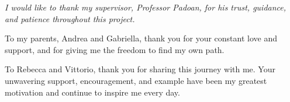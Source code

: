


\newcommand{\submissionblankpage}{%
  \null
  \thispagestyle{empty}%
  \clearpage
}

\newcommand{\submissionacknowledgementpage}{%
  \thispagestyle{empty}%
  \vspace*{\fill}
  \begin{center}
    \begin{minipage}{0.78\textwidth}
      \centering
      \itshape
      I would like to thank my supervisor, Professor Padoan, for his trust,
      guidance, and patience throughout this project.

      To my parents, Andrea and Gabriella, thank you for your constant love and
      support, and for giving me the freedom to find my own path.

      To Rebecca and Vittorio, thank you for sharing this journey with me.
      Your unwavering support, encouragement, and example have been my
      greatest motivation and continue to inspire me every day.
    \end{minipage}
  \end{center}
  \vspace*{\fill}
  \clearpage
}



\hypersetup{pageanchor=false}
\pagestyle{empty}
\submissionblankpage
\submissionblankpage
\submissionacknowledgementpage
\submissionblankpage

\hypersetup{pageanchor=true}
\pagestyle{plain}
\setcounter{page}{1}

\tableofcontents







\backmatter
\printbibliography[heading=bibintoc]


